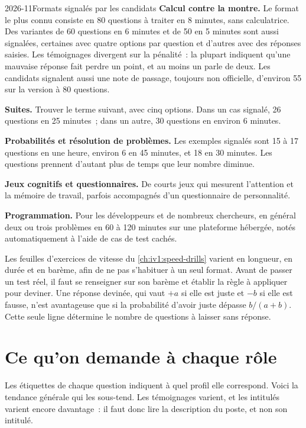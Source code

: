 \begin{dated}{2026-11}{Formats signalés par les candidats}\label{dat:iv1:how-to-train:formats}
\textbf{Calcul contre la montre.} Le format le plus connu consiste en 80 questions à traiter en 8 minutes, sans calculatrice. Des variantes de 60 questions en 6 minutes et de 50 en 5 minutes sont aussi signalées, certaines avec quatre options par question et d'autres avec des réponses saisies. Les témoignages divergent sur la pénalité~: la plupart indiquent qu'une mauvaise réponse fait perdre un point, et au moins un parle de deux. Les candidats signalent aussi une note de passage, toujours non officielle, d'environ 55 sur la version à 80 questions.

\textbf{Suites.} Trouver le terme suivant, avec cinq options. Dans un cas signalé, 26 questions en 25 minutes~; dans un autre, 30 questions en environ 6 minutes.

\textbf{Probabilités et résolution de problèmes.} Les exemples signalés sont 15 à 17 questions en une heure, environ 6 en 45 minutes, et 18 en 30 minutes. Les questions prennent d'autant plus de temps que leur nombre diminue.

\textbf{Jeux cognitifs et questionnaires.} De courts jeux qui mesurent l'attention et la mémoire de travail, parfois accompagnés d'un questionnaire de personnalité.

\textbf{Programmation.} Pour les développeurs et de nombreux chercheurs, en général deux ou trois problèmes en 60 à 120 minutes sur une plateforme hébergée, notés automatiquement à l'aide de cas de test cachés.
\end{dated}

Les feuilles d'exercices de vitesse du \cref{ch:iv1:speed-drills} varient en longueur, en durée et en barème, afin de ne pas s'habituer à un seul format. Avant de passer un test réel, il faut se renseigner sur son barème et établir la règle à appliquer pour deviner. Une réponse devinée, qui vaut $+a$ si elle est juste et $-b$ si elle est fausse, n'est avantageuse que si la probabilité d'avoir juste dépasse $b/(a + b)$. Cette seule ligne détermine le nombre de questions à laisser sans réponse.

\section{Ce qu'on demande à chaque rôle}

Les étiquettes de chaque question indiquent à quel profil elle correspond. Voici la tendance générale qui les sous-tend. Les témoignages varient, et les intitulés varient encore davantage~: il faut donc lire la description du poste, et non son intitulé.

